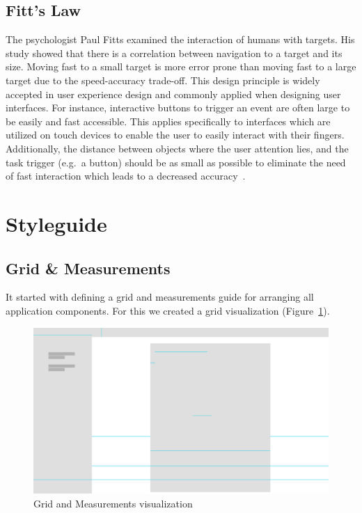 \subsection{Fitt's Law}\label{subsec:fitt's-law}
The psychologist Paul Fitts examined the interaction of humans with targets.
His study showed that there is a correlation between navigation to a target and its size.
Moving fast to a small target is more error prone than moving fast to a large target due to the speed-accuracy trade-off.
This design principle is widely accepted in user experience design and commonly applied when designing user interfaces.
For instance, interactive buttons to trigger an event are often large to be easily and fast accessible.
This applies specifically to interfaces which are utilized on touch devices to enable the user to easily interact with
their fingers.
Additionally, the distance between objects where the user attention lies, and the task trigger (e.g.\ a button) should be
as small as possible to eliminate the need of fast interaction which leads to a decreased accuracy~\cite{lawsofuxFL}.

\section{Styleguide}\label{sec:styleguide}

\subsection{Grid \& Measurements}\label{subsec:grid-and-measurements}

It started with defining a grid and measurements guide for arranging all application components. For this we created a
grid visualization (Figure~\ref{fig:grid}).

\begin{figure}[!ht]
    \centering
    \includegraphics[width=1.0\textwidth]{./images/grid.pdf}
    \caption{Grid and Measurements visualization}
    \label{fig:grid}
\end{figure}

